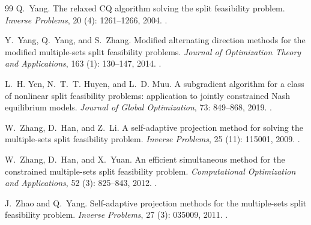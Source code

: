 \begin{thebibliography}{99}
Q.~Yang.
\newblock The relaxed {CQ} algorithm solving the split feasibility problem.
\newblock \emph{Inverse Problems}, 20 (4): 1261--1266, 2004.
\newblock {}.

Y.~Yang, Q.~Yang, and S.~Zhang.
\newblock Modified alternating direction methods for the modified multiple-sets split feasibility problems.
\newblock \emph{Journal of Optimization Theory and Applications}, 163 (1): 130--147, 2014.
\newblock {}.

L.~H. Yen, N.~T.~T. Huyen, and L.~D. Muu.
\newblock A subgradient algorithm for a class of nonlinear split feasibility problems: application to jointly constrained Nash equilibrium models.
\newblock \emph{Journal of Global Optimization}, 73: 849--868, 2019.
\newblock {}.

W.~Zhang, D.~Han, and Z.~Li.
\newblock A self-adaptive projection method for solving the multiple-sets split feasibility problem.
\newblock \emph{Inverse Problems}, 25 (11): 115001, 2009.
\newblock {}.

W.~Zhang, D.~Han, and X.~Yuan.
\newblock An efficient simultaneous method for the constrained multiple-sets split feasibility problem.
\newblock \emph{Computational Optimization and Applications}, 52 (3): 825--843, 2012.
\newblock {}.

J.~Zhao and Q.~Yang.
\newblock Self-adaptive projection methods for the multiple-sets split feasibility problem.
\newblock \emph{Inverse Problems}, 27 (3): 035009, 2011.
\newblock {}.

\end{thebibliography}


